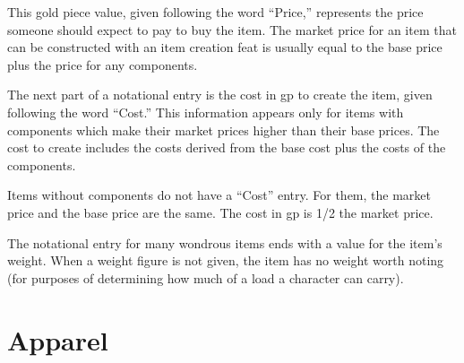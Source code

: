  This gold piece value, given following the word ``Price,'' represents the price someone should expect to pay to buy the item.
The market price for an item that can be constructed with an item creation feat is usually equal to the base price plus the price for any components.

 The next part of a notational entry is the cost in gp to create the item, given following the word ``Cost.'' This information appears only for items with components which make their market prices higher than their base prices.
The cost to create includes the costs derived from the base cost plus the costs of the components.

Items without components do not have a ``Cost'' entry.
For them, the market price and the base price are the same.
The cost in gp is 1/2 the market price.

 The notational entry for many wondrous items ends with a value for the item's weight.
When a weight figure is not given, the item has no weight worth noting (for purposes of determining how much of a load a character can carry).

\section{Apparel}

